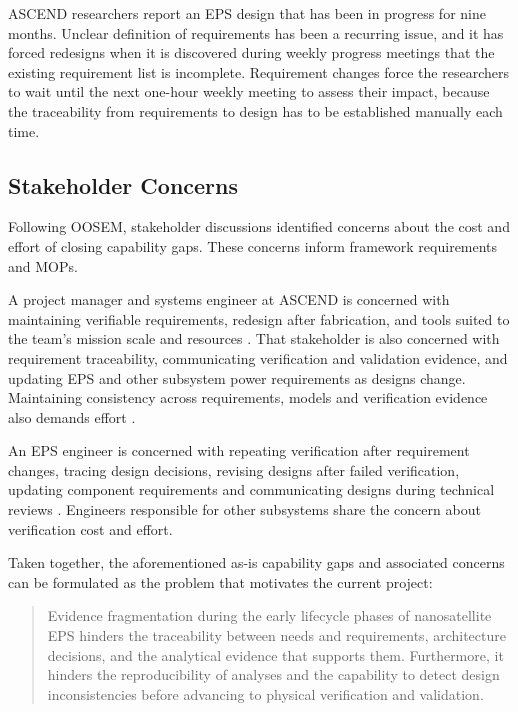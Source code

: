ASCEND researchers report an EPS design that has been in progress for nine months.
Unclear definition of requirements has been a recurring issue, and it has forced redesigns when it is discovered during weekly progress meetings that the existing requirement list is incomplete.
Requirement changes force the researchers to wait until the next one-hour weekly meeting to assess their impact, because the traceability from requirements to design has to be established manually each time.

\subsection{Stakeholder Concerns}
\label{sec:stakeholder-concerns}

Following OOSEM, stakeholder discussions identified concerns about the cost and effort of closing capability gaps.
These concerns inform framework requirements and MOPs.

A project manager and systems engineer at ASCEND is concerned with maintaining verifiable requirements, redesign after fabrication, and tools suited to the team's mission scale and resources \citep[Secs.~4--5]{handpicked-0003}\citep[Sec.~1]{review-0573}\citep[Sec.~5.1]{buruso2026modelbased}.
That stakeholder is also concerned with requirement traceability, communicating verification and validation evidence, and updating EPS and other subsystem power requirements as designs change.
Maintaining consistency across requirements, models and verification evidence also demands effort \citep[Secs.~4.4 and~5.1]{buruso2026modelbased}\citep[Secs.~3--4]{review-0853}\citep[Sec.~V]{citation-0136}.

An EPS engineer is concerned with repeating verification after requirement changes, tracing design decisions, revising designs after failed verification, updating component requirements and communicating designs during technical reviews \citep[pp.~1--3 and~6]{handpicked-0001}\citep[Sec.~3]{handpicked-0003}\citep[Secs.~5.1 and~6]{review-1251}.
Engineers responsible for other subsystems share the concern about verification cost and effort.

Taken together, the aforementioned as-is capability gaps and associated concerns can be formulated as the problem that motivates the current project:

\begin{quote}
Evidence fragmentation during the early lifecycle phases of nanosatellite EPS hinders the traceability between needs and requirements, architecture decisions, and the analytical evidence that supports them. Furthermore, it hinders the reproducibility of analyses and the capability to detect design inconsistencies before advancing to physical verification and validation.
\end{quote}
